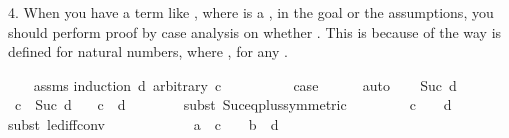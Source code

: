 \begin{isabellebody}
\begin{isamarkuptext}
  4. When you have a term like , where  is a , in the goal or the assumptions, you 
     should perform proof by case analysis on whether . This is because of the way \isa{{\isacharminus}{\kern0pt}} is
     defined for natural numbers, where , for any .%
\end{isamarkuptext}\isamarkuptrue%
%
\isadelimproof
\ \ %
\endisadelimproof
%
\isatagproof
{}\isamarkupfalse%
\ assms\isanewline
{}\isamarkupfalse%
{\isacharparenleft}{\kern0pt}induction\ d\ arbitrary{\isacharcolon}{\kern0pt}\ c{\isacharparenright}{\kern0pt}\isanewline
\ \ \isamarkupfalse%
\ {}\isanewline
\ \ \isamarkupfalse%
\ \isamarkupfalse%
\ {\isacharquery}{\kern0pt}case\isanewline
\ \ \ \ \isamarkupfalse%
\ auto\isanewline
{}\isamarkupfalse%
\isanewline
\ \ \isamarkupfalse%
\ {\isacharparenleft}{\kern0pt}Suc\ d{\isacharparenright}{\kern0pt}\isanewline
\ \ \isamarkupfalse%
\ {\isacartoucheopen}c\ {\isasymle}\ Suc\ d{\isacartoucheclose}\ \isamarkupfalse%
\ {}{\isacharcolon}{\kern0pt}\ {\isachardoublequoteopen}c\ {\isasymle}\ d\ {\isacharplus}{\kern0pt}\ {}{\isachardoublequoteclose}\isanewline
\ \ \ \ \isamarkupfalse%
\ {\isacharparenleft}{\kern0pt}subst\ Suc{\isacharunderscore}{\kern0pt}eq{\isacharunderscore}{\kern0pt}plus{}{\isacharbrackleft}{\kern0pt}symmetric{\isacharbrackright}{\kern0pt}{\isacharparenright}{\kern0pt}\isanewline
\ \ \ \ \isacommand{{\isachardot}{\kern0pt}}\isamarkupfalse%
\isanewline
\ \ \isamarkupfalse%
\ {\isachardoublequoteopen}c\ {\isacharminus}{\kern0pt}\ {}\ {\isasymle}\ d{\isachardoublequoteclose}\isanewline
\ \ \ \ \isamarkupfalse%
{\isacharparenleft}{\kern0pt}subst\ le{\isacharunderscore}{\kern0pt}diff{\isacharunderscore}{\kern0pt}conv{\isacharparenright}{\kern0pt}\isanewline
\ \ \ \ \isacommand{{\isachardot}{\kern0pt}}\isamarkupfalse%
\isanewline
\isanewline
\ \ \isanewline
\isanewline
\ \ \isamarkupfalse%
\ {}{\isacharcolon}{\kern0pt}\ {\isachardoublequoteopen}a\ {\isacharasterisk}{\kern0pt}\ {\isacharparenleft}{\kern0pt}c\ {\isacharminus}{\kern0pt}\ {}{\isacharparenright}{\kern0pt}\ {\isasymle}\ b\ {\isacharasterisk}{\kern0pt}\ d{\isachardoublequoteclose}\isanewline

\end{isabellebody}
